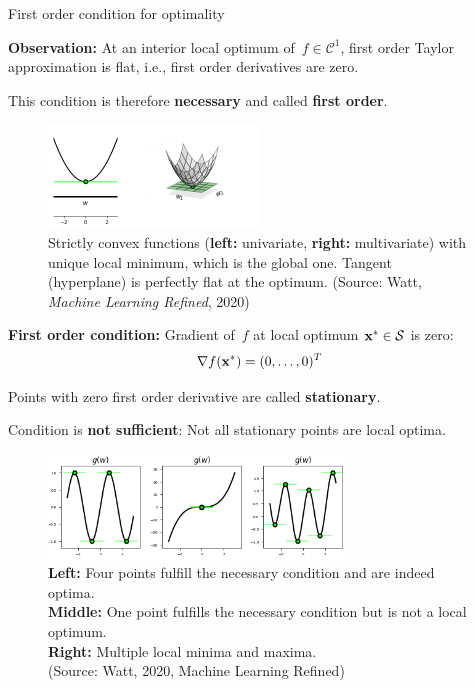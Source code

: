 \documentclass[11pt,compress,t,notes=noshow, xcolor=table]{beamer}
\begin{document}
\begin{vbframe}{First order condition for optimality}

\textbf{Observation:} At an interior local optimum of~$f\in\mathcal{C}^1$, first order Taylor approximation is flat, i.e., first order derivatives are zero.

\medskip

This condition is therefore \textbf{necessary} and called \textbf{first order}.

\begin{figure}
    \centering
    \includegraphics[width=0.5\textwidth]{figure_man/first_order.png}
    \caption*{\footnotesize
        Strictly convex functions (\textbf{left:} univariate, \textbf{right:} multivariate) with unique local minimum, which is the global one.
        Tangent (hyperplane) is perfectly flat at the optimum.
        (Source: Watt, \textit{Machine Learning Refined}, 2020)}
\end{figure}

\framebreak

\begin{kframe}
    \textbf{First order condition:}
    Gradient of~$f$ at local optimum $\mathbf{x}^\ast \in \mathcal{S}$ is zero:
    \vspace{-0.5\baselineskip}
    \begin{equation*}
        \nabla f(\mathbf{x}^\ast) = (0,\ldots,0)^T
    \end{equation*}
\end{kframe}

Points with zero first order derivative are called \textbf{stationary}. 

\medskip

Condition is \textbf{not sufficient}: Not all stationary points are local optima.

\begin{figure}
    \centering
    \includegraphics[width=0.7\textwidth]{figure_man/saddle_points_2.png}
    \captionsetup{justification=centering}
    \caption*{\footnotesize
        \textbf{Left:} Four points fulfill the necessary condition and are indeed optima. \\
        \textbf{Middle:} One point fulfills the necessary condition but is not a local optimum. \\
        \textbf{Right:} Multiple local minima and maxima. \\
        (Source: Watt, 2020, Machine Learning Refined)}
\end{figure}


\end{vbframe}
\end{document}
